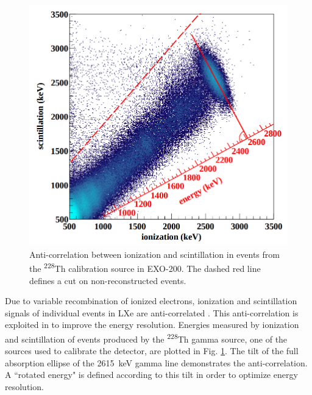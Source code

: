 \begin{figure} %
	\centering
	\includegraphics[width=.5\textwidth]{figures/anticorr.png}
	\caption{Anti-correlation between ionization and scintillation in events from the \textsuperscript{228}Th calibration source in EXO-200.  The dashed red line defines a cut on non-reconstructed events. \cite{EXO2000nuOriginal}}
\label{fig:antiCorr}
\end{figure}

Due to variable recombination of ionized electrons, ionization and scintillation signals of individual events in LXe are anti-correlated \cite{anticorr}.  This anti-correlation is exploited in  to improve the energy resolution.  Energies measured by ionization and scintillation of events produced by the \textsuperscript{228}Th gamma source, one of the sources used to calibrate the  detector, are plotted in Fig. \ref{fig:antiCorr}.  The tilt of the full absorption ellipse of the 2615~keV gamma line demonstrates the anti-correlation.  A ``rotated energy" is defined according to this tilt in order to optimize energy resolution.


